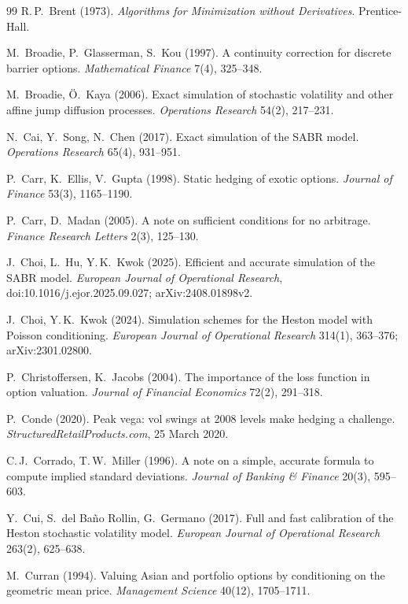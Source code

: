 \begin{thebibliography}{99}
R.\,P.~Brent (1973).
\emph{Algorithms for Minimization without Derivatives}.
Prentice-Hall.

M.~Broadie, P.~Glasserman, S.~Kou (1997).
A continuity correction for discrete barrier options.
\emph{Mathematical Finance} 7(4), 325--348.

M.~Broadie, Ö.~Kaya (2006).
Exact simulation of stochastic volatility and other affine jump diffusion processes.
\emph{Operations Research} 54(2), 217--231.

N.~Cai, Y.~Song, N.~Chen (2017).
Exact simulation of the SABR model.
\emph{Operations Research} 65(4), 931--951.

P.~Carr, K.~Ellis, V.~Gupta (1998).
Static hedging of exotic options.
\emph{Journal of Finance} 53(3), 1165--1190.

P.~Carr, D.~Madan (2005).
A note on sufficient conditions for no arbitrage.
\emph{Finance Research Letters} 2(3), 125--130.

J.~Choi, L.~Hu, Y.\,K.~Kwok (2025).
Efficient and accurate simulation of the SABR model.
\emph{European Journal of Operational Research}, doi:10.1016/j.ejor.2025.09.027; arXiv:2408.01898v2.

J.~Choi, Y.\,K.~Kwok (2024).
Simulation schemes for the Heston model with Poisson conditioning.
\emph{European Journal of Operational Research} 314(1), 363--376; arXiv:2301.02800.

P.~Christoffersen, K.~Jacobs (2004).
The importance of the loss function in option valuation.
\emph{Journal of Financial Economics} 72(2), 291--318.

P.~Conde (2020).
Peak vega: vol swings at 2008 levels make hedging a challenge.
\emph{StructuredRetailProducts.com}, 25 March 2020.

C.\,J.~Corrado, T.\,W.~Miller (1996).
A note on a simple, accurate formula to compute implied standard deviations.
\emph{Journal of Banking \& Finance} 20(3), 595--603.

Y.~Cui, S.~del Baño Rollin, G.~Germano (2017).
Full and fast calibration of the Heston stochastic volatility model.
\emph{European Journal of Operational Research} 263(2), 625--638.

M.~Curran (1994).
Valuing Asian and portfolio options by conditioning on the geometric mean price.
\emph{Management Science} 40(12), 1705--1711.


\end{thebibliography}
